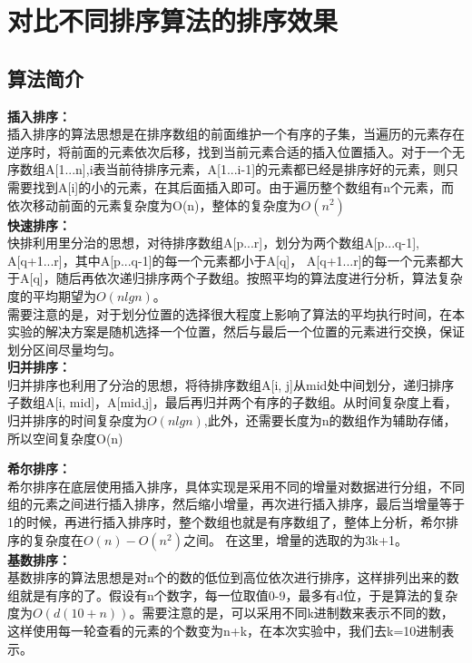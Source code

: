 \documentclass[UTF8]{ctexart}
\begin{document}

\section{对比不同排序算法的排序效果}

\subsection{算法简介}

\textbf{插入排序：}\\
插入排序的算法思想是在排序数组的前面维护一个有序的子集，当遍历的元素存在逆序时，将前面的元素依次后移，找到当前元素合适的插入位置插入。对于一个无序数组A[1...n],i表当前待排序元素，A[1...i-1]的元素都已经是排序好的元素，则只需要找到A[i]的小的元素，在其后面插入即可。由于遍历整个数组有n个元素，而依次移动前面的元素复杂度为O(n)，整体的复杂度为$O(n^2)$\\

\textbf{快速排序：}\\
快排利用里分治的思想，对待排序数组A[p...r]，划分为两个数组A[p...q-1], A[q+1...r]，其中A[p...q-1]的每一个元素都小于A[q]， A[q+1...r]的每一个元素都大于A[q]，随后再依次递归排序两个子数组。按照平均的算法度进行分析，算法复杂度的平均期望为$O(nlgn)$。\\
需要注意的是，对于划分位置的选择很大程度上影响了算法的平均执行时间，在本实验的解决方案是随机选择一个位置，然后与最后一个位置的元素进行交换，保证划分区间尽量均匀。\\

\textbf{归并排序：}\\
归并排序也利用了分治的思想，将待排序数组A[i, j]从mid处中间划分，递归排序子数组A[i, mid]，A[mid,j]，最后再归并两个有序的子数组。从时间复杂度上看，归并排序的时间复杂度为$O(nlgn)$,此外，还需要长度为n的数组作为辅助存储，所以空间复杂度O(n)

\textbf{希尔排序：}\\
希尔排序在底层使用插入排序，具体实现是采用不同的增量对数据进行分组，不同组的元素之间进行插入排序，然后缩小增量，再次进行插入排序，最后当增量等于1的时候，再进行插入排序时，整个数组也就是有序数组了，整体上分析，希尔排序的复杂度在$O(n)-O(n^2)$之间。
在这里，增量的选取的为3k+1。\\

\textbf{基数排序：}\\
基数排序的算法思想是对n个的数的低位到高位依次进行排序，这样排列出来的数组就是有序的了。假设有n个数字，每一位取值0-9，最多有d位，于是算法的复杂度为$O(d(10+n))$。需要注意的是，可以采用不同k进制数来表示不同的数，这样使用每一轮查看的元素的个数变为n+k，在本次实验中，我们去k=10进制表示。
\end{document}
